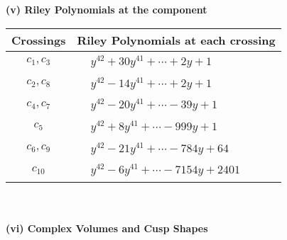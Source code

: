 \documentclass[1p]{elsarticle_modified}
\theoremstyle{definition}
\begin{document}
\flushleft \textbf{(v) Riley Polynomials at the component}\newline \\
\begin{tabular}{m{50pt}|m{274pt}}
Crossings & \hspace{64pt}Riley Polynomials at each crossing \\
\hline $$\begin{aligned}c_{1},c_{3}\end{aligned}$$&$\begin{aligned}
&y^{42}+30 y^{41}+\cdots+2 y+1
\end{aligned}$\\
\hline $$\begin{aligned}c_{2},c_{8}\end{aligned}$$&$\begin{aligned}
&y^{42}-14 y^{41}+\cdots+2 y+1
\end{aligned}$\\
\hline $$\begin{aligned}c_{4},c_{7}\end{aligned}$$&$\begin{aligned}
&y^{42}-20 y^{41}+\cdots-39 y+1
\end{aligned}$\\
\hline $$\begin{aligned}c_{5}\end{aligned}$$&$\begin{aligned}
&y^{42}+8 y^{41}+\cdots-999 y+1
\end{aligned}$\\
\hline $$\begin{aligned}c_{6},c_{9}\end{aligned}$$&$\begin{aligned}
&y^{42}-21 y^{41}+\cdots-784 y+64
\end{aligned}$\\
\hline $$\begin{aligned}c_{10}\end{aligned}$$&$\begin{aligned}
&y^{42}-6 y^{41}+\cdots-7154 y+2401
\end{aligned}$\\
\hline
\end{tabular}\\~\\
\newpage\flushleft \textbf{(vi) Complex Volumes and Cusp Shapes}
\end{document}
